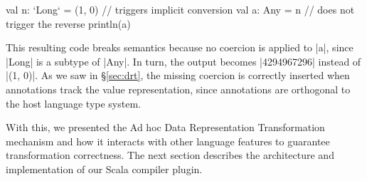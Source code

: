 \begin{lstlisting-nobreak}
val n: `Long` = (1, 0) // triggers implicit conversion
val a: Any = n              // does not trigger the reverse
println(a)
\end{lstlisting-nobreak}

This resulting code breaks semantics because no coercion is applied to |a|, since |Long| is a subtype of |Any|. In turn, the output becomes |4294967296| instead of |(1, 0)|. As we saw in \S\ref{sec:drt}, the missing coercion is correctly inserted when annotations track the value representation, since annotations are orthogonal to the host language type system.

With this, we presented the Ad hoc Data Representation Transformation mechanism and how it interacts with other language features to guarantee transformation correctness. The next section describes the architecture and implementation of our Scala compiler plugin. 
